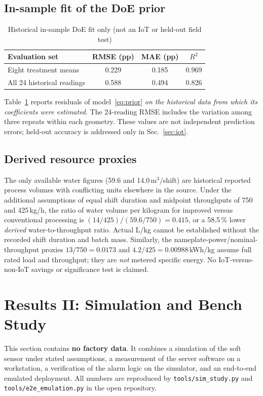 \documentclass[journal]{IEEEtran}
\begin{document}
\subsection{In-sample fit of the DoE prior}
\begin{table}[t]\centering\small
\caption{Historical in-sample DoE fit only (not an IoT or held-out field test)}
\label{tab:insample}
\begin{tabular}{lccc}\toprule
Evaluation set & RMSE (pp) & MAE (pp) & $R^2$\\\midrule
Eight treatment means & 0.229 & 0.185 & 0.969\\
All 24 historical readings & 0.588 & 0.494 & 0.826\\\bottomrule
\end{tabular}
\end{table}
Table~\ref{tab:insample} reports residuals of model~\eqref{eq:prior}
\emph{on the historical data from which its coefficients were estimated}.
The 24-reading RMSE includes the variation among three repeats within each
geometry. These values are not independent prediction errors; held-out accuracy
is addressed only in Sec.~\ref{sec:iot}.

\subsection{Derived resource proxies}
The only available water figures (59.6 and 14.0\,m$^3$/shift)
are historical reported process volumes with conflicting units elsewhere in
the source. Under the additional assumptions of equal shift duration and
midpoint throughputs of 750 and 425\,kg/h, the ratio of water volume per
kilogram for improved versus conventional processing is
$(14/425)/(59.6/750)=0.415$, or a 58.5\,\% lower \emph{derived}
water-to-throughput ratio. Actual L/kg cannot be established without the
recorded shift duration and batch mass. Similarly, the nameplate-power/nominal-throughput
proxies $13/750=0.0173$ and $4.2/425=0.00988$\,kWh/kg assume full rated load and
throughput; they are \emph{not} metered specific energy.
No IoT-versus-non-IoT savings or significance test is claimed.

\section{Results II: Simulation and Bench Study}
\label{sec:sim}
This section contains \textbf{no factory data}. It combines a simulation of the soft sensor under stated assumptions,
a measurement of the server software on a workstation, a verification of the alarm logic on the simulator, and an
end-to-end emulated deployment. All numbers are reproduced by \texttt{tools/sim\_study.py} and
\texttt{tools/e2e\_emulation.py} in the open repository.
\end{document}

